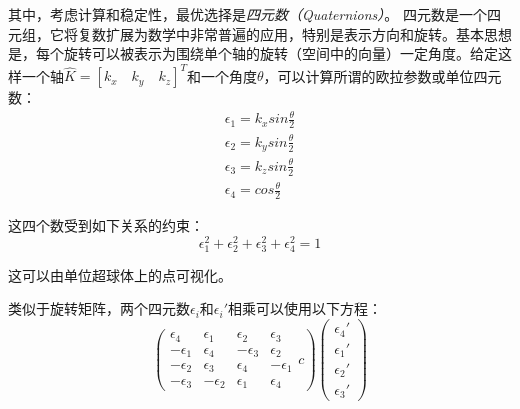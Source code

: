 其中，考虑计算和稳定性，最优选择是\emph{四元数（Quaternions）}。 四元数是一个四元组，它将复数扩展为数学中非常普遍的应用，特别是表示方向和旋转。基本思想是，每个旋转可以被表示为围绕单个轴的旋转（空间中的向量）一定角度。给定这样一个轴$\hat{K}=[k_x\quad k_y\quad k_z]^T$和一个角度$\theta$，可以计算所谓的欧拉参数或单位四元数：
\begin{eqnarray}
\epsilon_1=k_x sin \frac{\theta}{2}\\
\epsilon_2=k_y sin \frac{\theta}{2}\\
\epsilon_3=k_z sin \frac{\theta}{2}\\
\epsilon_4=cos\frac{\theta}{2}
\end{eqnarray}

这四个数受到如下关系的约束：
\begin{equation}
\epsilon_1^2+\epsilon_2^2+\epsilon_3^2+\epsilon_4^2=1
\end{equation}

这可以由单位超球体上的点可视化。


类似于旋转矩阵，两个四元数$\epsilon_i$和$\epsilon_i'$相乘可以使用以下方程：
\begin{equation}
\left(
\begin{array}{cccc}
\epsilon_4 & \epsilon_1 & \epsilon_2 & \epsilon_3\\
-\epsilon_1 & \epsilon_4 & -\epsilon_3 & \epsilon_2\\
-\epsilon_2 & \epsilon_3 & \epsilon_4 & -\epsilon_1\\
-\epsilon_3 & -\epsilon_2 & \epsilon_1 & \epsilon_4
\end{array}{c}
\right)
\left(\begin{array}{c}\epsilon_4'\\\epsilon_1'\\\epsilon_2'\\\epsilon_3'\end{array}\right)
\end{equation}

